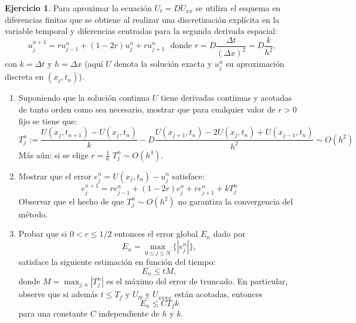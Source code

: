 \documentclass[12pt, a4paper]{amsbook}
\theoremstyle{remark}
\theoremstyle{definition}
\newtheorem{ejer}[teo]{Ejercicio}
\numberwithin{section}{chapter}
\numberwithin{subsection}{section}
\numberwithin{equation}{section}
\numberwithin{figure}{chapter}
\begin{document}
\begin{ejer}\label{forward} Para aproximar la ecuación $U_t=D U_{xx}$ se utiliza el esquema en
diferencias finitas que se obtiene al realizar una discretización explícita en la variable
temporal y diferencias centradas para la segunda derivada espacial:
\[ u_j^{n+1}=ru_{j-1}^n+(1-2r)u_j^n+ru_{j+1}^n \ \ \ \mbox{donde }r=D\frac
{\Delta t}{(\Delta x)^2}=D\frac{k}{h^2},\]
con $k=\Delta t$ y $h=\Delta x$ (aquí $U$ denota la solución exacta y $u_j^n$ su aproximación discreta en $(x_j,t_n)$).

\begin{enumerate}[label=(\alph*)]
\item Suponiendo que la solución  continua $U$ tiene derivadas continuas y acotadas de tanto orden como sea necesario, mostrar que para cualquier valor de $r>0$ fijo se tiene que: 
\[T_j^n:=\frac{U(x_j,t_{n+1})-U(x_j,t_n)}{k}-D\frac{U(x_{j+1},t_n)-2U(x_j,t_n)+U(x_{j-1},t_n)}{h^2}\sim O(h^2)\]
Más aún: si se elige $r=\frac{1}{6}$ $T_j^n\sim O(h^4)$.
\item Mostrar que el error $e_j^{n}=U(x_j,t_n)-u_j^n$ satisface:
\[e_j^{n+1}=re_{j-1}^n+(1-2r)e_j^n+re_{j+1}^n +kT_j^n\]
Observar que el hecho de que $T_j^n\sim O(h^2)$ no garantiza la convergencia del método. 
\item Probar que  si $0<r\leq 1/2$ entonces el error global $E_n$ dado por
 $$ E_n=\max_{0\leq j \leq N} \{|e^n_j|\}, $$
 satisface la siguiente estimación en función del tiempo:
 $$ E_n\leq t M, $$
 donde $M=\max_{j,n}|T_j^n|$ es el máximo del error de truncado. En particular, observe que
 si además $t\leq T_f$ y $U_{tt}$ y $U_{xxxx}$
 están acotadas, entonces
 \begin{equation}\label{cota1}
 E_n\leq C T_f k
 \end{equation}
 para una constante $C$ independiente de $h$ y $k$.

\end{enumerate}
\end{ejer}
\end{document}
